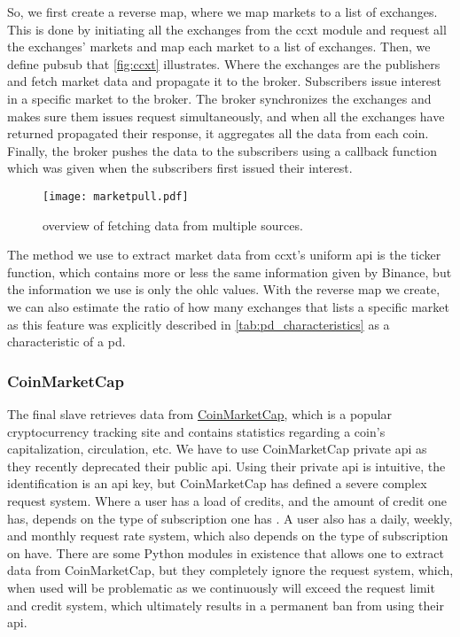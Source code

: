 So, we first create a reverse map, where we map markets to a list of exchanges. This is done by initiating all the exchanges from the ccxt module and request all the exchanges' markets and map each market to a list of exchanges. Then, we define \ac{pubsub} that \autoref{fig:ccxt} illustrates. Where the exchanges are the publishers and fetch market data and propagate it to the broker. Subscribers issue interest in a specific market to the broker. The broker synchronizes the exchanges and makes sure them issues request simultaneously, and when all the exchanges have returned propagated their response, it aggregates all the data from each coin. Finally, the broker pushes the data to the subscribers using a callback function which was given when the subscribers first issued their interest.

\begin{figure}
    \centering
    \texttt{[image: marketpull.pdf]}
    \caption{overview of fetching data from multiple sources.}
    \label{fig:ccxt}
\end{figure}

The method we use to extract market data from ccxt's uniform \ac{api} is the ticker function, which contains more or less the same information given by Binance, but the information we use is only the \ac{ohlc} values. With the reverse map we create, we can also estimate the ratio of how many exchanges that lists a specific market as this feature was explicitly described in \autoref{tab:pd_characteristics} as a characteristic of a \ac{pd}.

\subsubsection{CoinMarketCap}
The final slave retrieves data from \href{https://coinmarketcap.com/}{CoinMarketCap}, which is a popular cryptocurrency tracking site and contains statistics regarding a coin's capitalization, circulation, etc. We have to use CoinMarketCap private \ac{api} as they recently deprecated their public \ac{api}. Using their private \ac{api} is intuitive, the identification is an \ac{api} key, but CoinMarketCap has defined a severe complex request system. Where a user has a load of credits, and the amount of credit one has, depends on the type of subscription one has . A user also has a daily, weekly, and monthly request rate system, which also depends on the type of subscription on have. There are some Python modules in existence that allows one to extract data from CoinMarketCap, but they completely ignore the request system, which, when used will be problematic as we continuously will exceed the request limit and credit system, which ultimately results in a permanent ban from using their \ac{api}.

